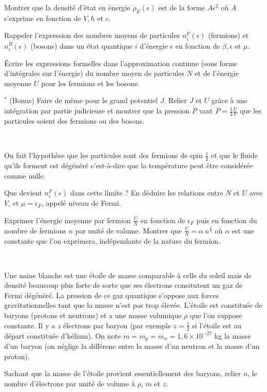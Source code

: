 \documentclass[utf8, 11pt]{feuille}
\begin{document}
\question Montrer que la densité d'état en énergie $\rho_E(\epsilon)$ est de la forme $A \epsilon^2$ où $A$ s'exprime en fonction de $V, h$ et $c$. 

\question Rappeler l'expression des nombres moyens de particules $n_i^F(\epsilon)$ (fermions) et $n_i^B(\epsilon)$ (bosons) dans un état quantique $i$ d'énergie $\epsilon$ en fonction de $\beta, \epsilon$ et $\mu$.

\question \'Ecrire les expressions formelles dans l'approximation continue (sous forme d'intégrales sur l'énergie)  du nombre moyen de particules $N$ et de l'énergie moyenne $U$ pour les fermions et les bosons.

\question$^*$ (Bonus) Faire de même pour le grand potentiel $J$. Relier $J$ et $U$ grâce à une intégration par partie judicieuse et montrer que la pression $P$ vaut $P=\frac{1}{3}\frac{U}{V}$ que les particules soient des fermions ou des bosons. 

\ 

On fait l'hypothèse que les particules sont des fermions de spin $\frac{1}{2}$ et que le fluide qu'ils forment est dégénéré c'est-à-dire que la température peut être considérée comme nulle.

\question Que devient $n_i^F(\epsilon)$ dans cette limite ? En déduire les relations entre $N$ et $U$ avec $V$, et $\mu=\epsilon_F$, appelé niveau de Fermi.

\question Exprimer l'énergie moyenne par fermion $\frac{U}{N}$ en fonction de $\epsilon_F$ puis en fonction du nombre de fermions $n$ par unité de volume. Montrer que $\frac{U}{N}=\alpha \ n^{\frac{1}{3}}$ où $\alpha$ est une constante que l'on exprimera, indépendante de la nature du fermion.


\ 

Une naine blanche est une étoile de masse comparable à celle du soleil mais de densité beaucoup plus forte de sorte que ses électrons consitutent un gaz de Fermi dégénéré. La pression de ce gaz quantique s'oppose aux forces gravitationnelles tant que la masse n'est pas trop élevée. L'étoile est constituée de baryons (protons et neutrons) et a une masse volumique $\rho$ que l'on suppose constante. Il y a $z$ électrons par baryon (par exemple $z=\frac{1}{2}$ si l'étoile est au départ constituée d'hélium). On note $m=m_p=m_n=1,6 \times 10^{-27}$ kg la masse d'un baryon (on néglige la différene entre la masse d'un neutron et la masse d'un proton).

\question Sachant que la masse de l'étoile provient essentiellement des baryons, relier $n$, le nombre d'électrons par unité de volume à $\rho$, $m$ et $z$.
\end{document}
